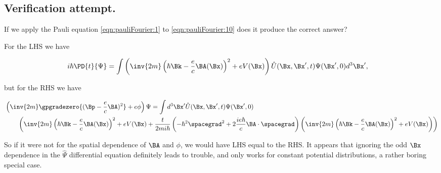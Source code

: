 \subsection{Verification attempt.}

If we apply the Pauli equation \ref{eqn:pauliFourier:1} to \ref{eqn:pauliFourier:10} does it produce the correct answer?

For the LHS we have

\begin{align}\label{eqn:pauliFourier:30}
i \hbar \PD{t}{\Psi} 
&=
\int \left( 
\inv{2m} \left( \hbar \Bk - \frac{e}{c} \BA(\Bx) \right)^2 + e V(\Bx) 
\right) \hat{U}(\Bx, \Bx', t) \Psi(\Bx', 0) d^3 \Bx',
\end{align}

but for the RHS we have

\begin{align}\label{eqn:pauliFourier:31}
&\left( \inv{2m} \gpgradezero{(\Bp - \frac{e}{c}\BA)^2} + e \phi \right) \Psi
=
\int 
d^3 \Bx'
\hat{U}(\Bx, \Bx', t) \Psi(\Bx', 0)  \\
&\qquad\left( 
\inv{2m} \left( \hbar \Bk - \frac{e}{c} \BA(\Bx) \right)^2 + e V(\Bx) 
+\frac{t}{2m i \hbar} 
\left( - \hbar^2 \spacegrad^2 + 2 \frac{i e \hbar }{c} \BA \cdot \spacegrad \right)
\left( 
\inv{2m} \left( \hbar \Bk - \frac{e}{c} \BA(\Bx) \right)^2 + e V(\Bx)
\right)
\right) 
\end{align}

So if it were not for the spatial dependence of $\BA$ and $\phi$, we would have LHS equal to the RHS.  It appears that ignoring the odd $\Bx$ dependence in the $\hat{\Psi}$ differential equation definitely leads to trouble, and only works for constant potential distributions, a rather boring special case.

\EndArticle
